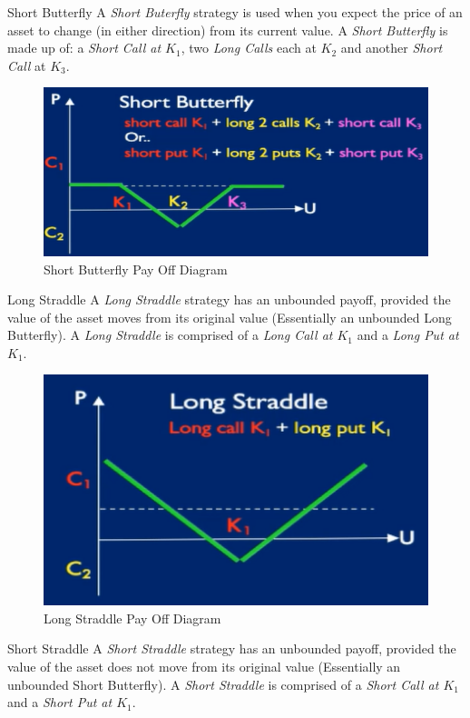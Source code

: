 \documentclass[11pt,a4paper]{article}
\begin{document}
\begin{definition}{Short Butterfly}
  A \textit{Short Buterfly} strategy is used when you expect the price of an asset to change (in either direction) from its current value. A \textit{Short Butterfly} is made up of: a \textit{Short Call at $K_1$}, two \textit{Long Calls} each at $K_2$ and another \textit{Short Call} at $K_3$.
\end{definition}

\begin{figure}[ht!]
  \centering
  \includegraphics[width=.5\textwidth]{shortButterfly.PNG}
  \caption{Short Butterfly Pay Off Diagram}
\end{figure}

\begin{definition}{Long Straddle}
  A \textit{Long Straddle} strategy has an unbounded payoff, provided the value of the asset moves from its original value (Essentially an unbounded Long Butterfly). A \textit{Long Straddle} is comprised of a \textit{Long Call at $K_1$} and a \textit{Long Put at $K_1$}.
\end{definition}

\begin{figure}[ht!]
  \centering
  \includegraphics[width=.5\textwidth]{longStraddle.PNG}
  \caption{Long Straddle   Pay Off Diagram}
\end{figure}

\begin{definition}{Short Straddle}
  A \textit{Short Straddle} strategy has an unbounded payoff, provided the value of the asset does not move from its original value (Essentially an unbounded Short Butterfly). A \textit{Short Straddle} is comprised of a \textit{Short Call at $K_1$} and a \textit{Short Put at $K_1$}.
\end{definition}
\end{document}
